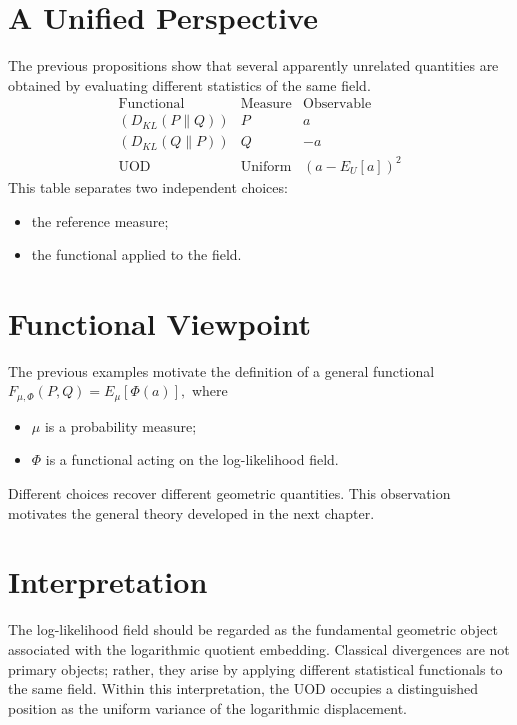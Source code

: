 \section{A Unified Perspective}
The previous propositions show that several apparently unrelated
quantities are obtained by evaluating different statistics of the same
field.
\[
\begin{array}{lll}
\text{Functional} & \text{Measure} & \text{Observable} \\
\hline
(D_{KL}(P\|Q)) & P & a \\
(D_{KL}(Q\|P)) & Q & -a \\
\text{UOD} & \text{Uniform} & (a-E_U[a])^2
\end{array}
\]
This table separates two independent choices:
\begin{itemize}
  \item the reference measure;
  \item the functional applied to the field.
\end{itemize}
\section{Functional Viewpoint}
The previous examples motivate the definition of a general functional
$F_{\mu,\Phi}(P,Q) = E_\mu[\Phi(a)],$
where
\begin{itemize}
  \item \(\mu\) is a probability measure;
  \item \(\Phi\) is a functional acting on the log-likelihood field.
\end{itemize}
Different choices recover different geometric quantities.
This observation motivates the general theory developed in the next
chapter.
\section{Interpretation}
The log-likelihood field should be regarded as the fundamental geometric
object associated with the logarithmic quotient embedding.
Classical divergences are not primary objects; rather, they arise by
applying different statistical functionals to the same field.
Within this interpretation, the UOD occupies a distinguished position as
the uniform variance of the logarithmic displacement.
